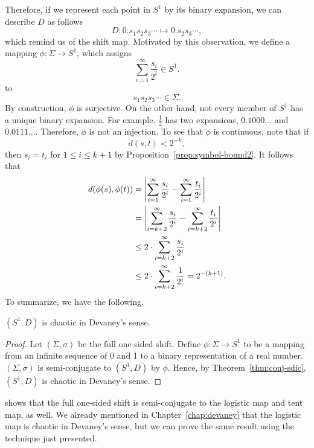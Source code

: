 \documentclass[10pt,twoside]{book}
\begin{document}
Therefore, if we represent each point in $S^1$ by its binary expansion, we can describe $D$ as follows
\begin{equation*}
  D: 0.s_1 s_2 s_3 \cdots \mapsto 0.s_2 s_3 \cdots,
\end{equation*}
which remind us of the shift map.
Motivated by this observation, we define a mapping $\phi: \Sigma \to S^1$, which assigns
\begin{equation*}
  \sum\limits_{i = 1}^{\infty} \frac{s_i}{2^i} \in S^1.
\end{equation*}
to
\begin{equation*}
  s_1 s_2 s_3 \cdots \in \Sigma.
\end{equation*}
By construction, $\phi$ is surjective.
On the other hand, not every member of $S^1$ has a unique binary expansion. 
For example, $\frac{1}{2}$ has two expansions, $0.1000\ldots$ and $0.0111\ldots$.
Therefore, $\phi$ is not an injection.
To see that $\phi$ is continuous, note that if
\begin{equation*}
  d(s,t) < 2^{-k},
\end{equation*}
then $s_i = t_i$ for $1 \leq i \leq k+1$ by Proposition~\ref{prop:symbol-bound2}.
It follows that
\begin{align*}
  d(\phi(s), \phi(t))
  &= \left |  \sum\limits_{i=1}^{\infty} \frac{s_i}{2^i} - \sum\limits_{i=1}^{\infty} \frac{t_i}{2^i}  \right | \\
  &= \left |  \sum\limits_{i=k+2}^{\infty} \frac{s_i}{2^i} - \sum\limits_{i=k+2}^{\infty} \frac{t_i}{2^i}  \right | \\
  &\leq 2 \cdot \sum\limits_{i=k+2}^{\infty} \frac{s_i}{2^i}  \\
  &\leq 2 \cdot \sum\limits_{i=k+2}^{\infty} \frac{1}{2^i}
  = 2^{-(k+1)}.
\end{align*}
To summarize, we have the following.
\begin{theorem}
  $(S^1, D)$ is chaotic in Devaney's sense.
  \begin{proof}
    Let $(\Sigma, \sigma)$ be the full one-sided shift.
    Define $\phi: \Sigma \to S^1$ to be a mapping from an infinite sequence of 0 and 1 to a binary representation of a real number.
    $(\Sigma, \sigma)$ is semi-conjugate to $(S^1, D)$ by $\phi$.
    Hence, by Theorem~\ref{thm:conj-sdic}, $(S^1, D)$ is chaotic in Devaney's sense.
  \end{proof}
\end{theorem}
\citet[Chap.4]{sternberg} shows that the full one-sided shift is semi-conjugate to the logistic map and tent map, as well.
We already mentioned in Chapter~\ref{chap:devaney} that the logistic map is chaotic in Devaney's sense, but we can prove the same result using the technique just presented.
\end{document}
